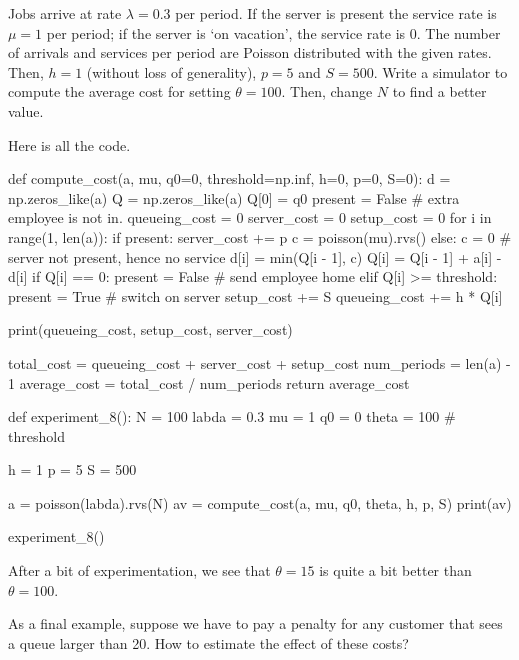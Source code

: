 \begin{exercise}
  Jobs arrive at rate $\lambda=0.3$ per period.
  If the server is present the service rate is $\mu=1$ per period; if the server is `on vacation', the service rate is 0.
  The number of arrivals and services per period are Poisson distributed with the given rates.
  Then, $h=1$ (without loss of generality), $p=5$ and $S=500$.
  Write a simulator to compute the average cost for setting $\theta=100$.
  Then, change $N$ to find a better value.

\begin{solution}
Here is all the code.
\begin{pyverbatim}
def compute_cost(a, mu, q0=0, threshold=np.inf, h=0, p=0, S=0):
    d = np.zeros_like(a)
    Q = np.zeros_like(a)
    Q[0] = q0
    present = False  # extra employee is not in.
    queueing_cost = 0
    server_cost = 0
    setup_cost = 0
    for i in range(1, len(a)):
        if present:
            server_cost += p
            c = poisson(mu).rvs()
        else:
            c = 0  # server not present, hence no service
        d[i] = min(Q[i - 1], c)
        Q[i] = Q[i - 1] + a[i] - d[i]
        if Q[i] == 0:
            present = False  # send employee home
        elif Q[i] >= threshold:
            present = True  # switch on server
            setup_cost += S
        queueing_cost += h * Q[i]

    print(queueing_cost, setup_cost, server_cost)

    total_cost = queueing_cost + server_cost + setup_cost
    num_periods = len(a) - 1
    average_cost = total_cost / num_periods
    return average_cost


def experiment_8():
    N = 100
    labda = 0.3
    mu = 1
    q0 = 0
    theta = 100  # threshold

    h = 1
    p = 5
    S = 500

    a = poisson(labda).rvs(N)
    av = compute_cost(a, mu, q0, theta, h, p, S)
    print(av)

experiment_8()
\end{pyverbatim}
After a bit of experimentation, we see that $\theta=15$ is quite a bit better than $\theta=100$.

\end{solution}
\end{exercise}


As a final example, suppose we have to pay a penalty for any customer that sees a queue larger than 20. How to estimate the effect of these costs? 


